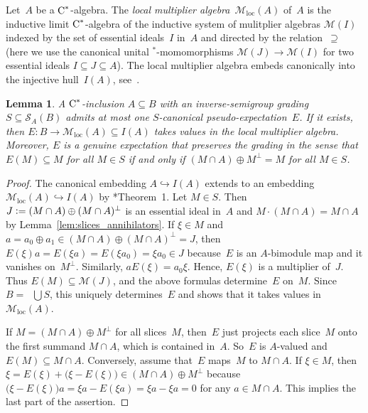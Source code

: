 \documentclass[a4paper]{amsart}
\theoremstyle{plain}
\newtheorem{lemma}[theorem]{Lemma}
\theoremstyle{definition}
\theoremstyle{remark}
\numberwithin{theorem}{section}
\numberwithin{equation}{section}
\DeclareMathOperator*{\clsp}{\overline{span}} %
\newcommand*{\nb}{\nobreakdash}
\newcommand*{\Star}{\(^*\)\nobreakdash-}
\newcommand*{\Cst}{\textup C^*}%
\newcommand*{\Mult}{\mathcal M}%
\newcommand*{\Locmult}{\mathcal{M}_{\mathrm{loc}}}%
\newcommand*{\Slice}{\mathcal S}%
\newcommand*{\defeq}{\mathrel{\vcentcolon=}}%
\begin{document}
Let~\(A\) be a \(\Cst\)\nb-algebra.
The \emph{local multiplier algebra}~\(\Locmult(A)\) of~\(A\) is the
inductive limit \(\Cst\)\nb-algebra of the inductive system of
mulitplier algebras \(\Mult(I)\) indexed by the set of essential
ideals~\(I\) in~\(A\) and directed by the relation~\(\supseteq\)
(here we use the canonical unital \Star{}momomorphisms \(\Mult(J) \to
\Mult(I)\) for two essential ideals \(I\subseteq J \subseteq A\)).
The local multiplier algebra embeds canonically into the injective
hull~\(I(A)\), see~\cite{Frank:Injective_local_multiplier}.

\begin{lemma}
  \label{lem:genuine_expectation}
  A \(\Cst\)\nb-inclusion \(A\subseteq B\) with an inverse-semigroup
  grading \(S\subseteq \Slice_A(B)\) admits at most one
  \(S\)\nb-canonical pseudo-expectation~\(E\).
  If it exists, then \(E\colon B\to \Locmult(A)\subseteq I(A)\) takes
  values in the local multiplier algebra.
  Moreover, \(E\) is a genuine expectation that preserves the grading
  in the sense that \(E(M)\subseteq M\) for all \(M\in S\) if and only
  if \((M\cap A)\oplus M^\bot=M\) for all \(M\in S\).
\end{lemma}

\begin{proof}
  The canonical embedding \(A\hookrightarrow I(A)\) extends to an
  embedding \(\Locmult(A) \hookrightarrow I(A)\) by
  \cite{Frank:Injective_local_multiplier}*{Theorem~1}.
  Let \(M\in S\).
  Then \(J\defeq (M\cap A)\oplus(M\cap A)^\bot\) is an essential ideal
  in~\(A\) and \(M \cdot (M\cap A)= M\cap A\) by
  Lemma~\ref{lem:slices_annihilators}.
  If \(\xi\in M\) and  \(a=a_0\oplus a_1\in (M\cap A)\oplus(M\cap
  A)^\bot=J\), then \(E(\xi) a=E(\xi a)=E(\xi a_0)=  \xi a_0 \in J\)
  because~\(E\) is an \(A\)\nb-bimodule map and it vanishes
  on~\(M^\bot\).
  Similarly, \(a E(\xi) =a_0\xi\).
  Hence, \(E(\xi)\) is a multiplier of~\(J\).
  Thus \(E(M)\subseteq \Mult(J)\), and the above formulas
  determine~\(E\) on~\(M\).
  Since \(B=\clsp\bigcup S\), this uniquely determines~\(E\) and shows
  that it takes values in~\(\Locmult(A)\).

  If \(M=(M\cap A)\oplus M^\bot\) for all slices~\(M\), then~\(E\) just
  projects each slice~\(M\) onto the first summand \(M\cap A\), which
  is contained in~\(A\).
  So~\(E\) is \(A\)\nb-valued and \(E(M)\subseteq M\cap A\).
  Conversely, assume that~\(E\) maps~\(M\) to \(M\cap A\).
  If \(\xi \in M\), then \(\xi=E(\xi) + \bigl(\xi-E(\xi)\bigr) \in
  (M\cap A)\oplus M^\bot\) because \(\bigl(\xi-E(\xi)\bigr) a=\xi a
  -E(\xi a)=\xi a -\xi a=0\) for any \(a\in M\cap A\).
  This implies the last part of the assertion.
\end{proof}
\end{document}
